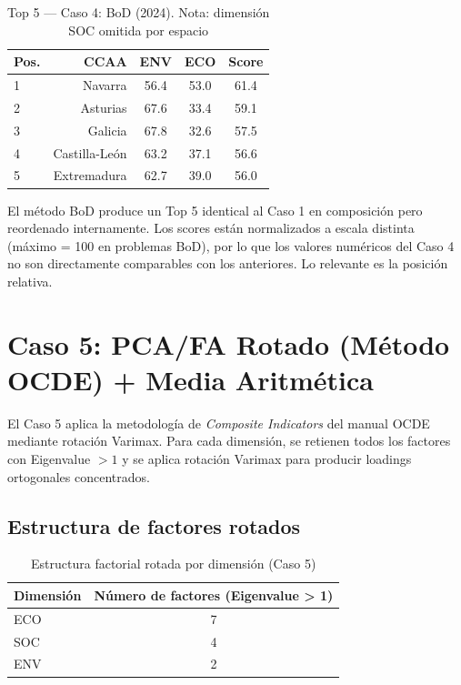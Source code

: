 \begin{table}[H]
    \centering
    \small
    \begin{tabular}{lrccc}
        \toprule
        \textbf{Pos.} & \textbf{CCAA} & \textbf{ENV} & \textbf{ECO} & \textbf{Score} \\
        \midrule
        1 & Navarra & 56.4 & 53.0 & 61.4 \\
        2 & Asturias & 67.6 & 33.4 & 59.1 \\
        3 & Galicia & 67.8 & 32.6 & 57.5 \\
        4 & Castilla-León & 63.2 & 37.1 & 56.6 \\
        5 & Extremadura & 62.7 & 39.0 & 56.0 \\
        \bottomrule
    \end{tabular}
    \caption{Top 5 — Caso 4: BoD (2024). Nota: dimensión SOC omitida por espacio}
    \label{tab:caso4_2024}
\end{table}

El método BoD produce un Top 5 identical al Caso 1 en composición pero reordenado internamente. Los scores están normalizados a escala distinta (máximo = 100 en problemas BoD), por lo que los valores numéricos del Caso 4 no son directamente comparables con los anteriores. Lo relevante es la posición relativa.

\section{Caso 5: PCA/FA Rotado (Método OCDE) + Media Aritmética}

El Caso 5 aplica la metodología de \emph{Composite Indicators} del manual OCDE mediante rotación Varimax. Para cada dimensión, se retienen todos los factores con Eigenvalue $> 1$ y se aplica rotación Varimax para producir loadings ortogonales concentrados.

\subsection{Estructura de factores rotados}

\begin{table}[H]
    \centering
    \small
    \begin{tabular}{lc}
        \toprule
        \textbf{Dimensión} & \textbf{Número de factores (Eigenvalue > 1)} \\
        \midrule
        ECO & 7 \\
        SOC & 4 \\
        ENV & 2 \\
        \bottomrule
    \end{tabular}
    \caption{Estructura factorial rotada por dimensión (Caso 5)}
    \label{tab:factores_rotados}
\end{table}

